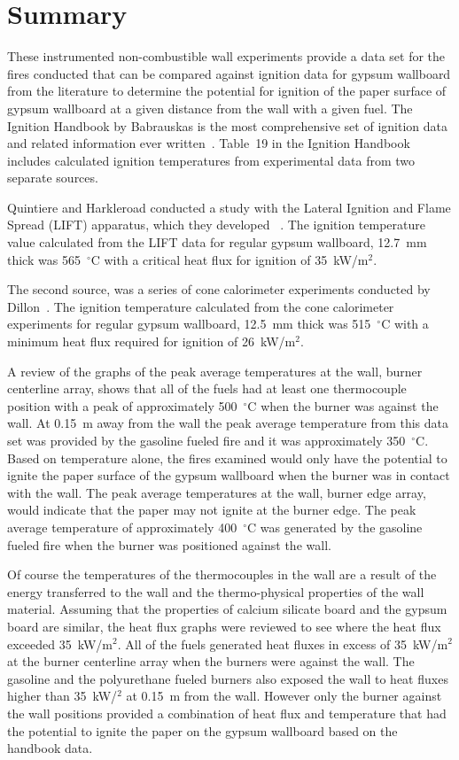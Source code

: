 \documentclass[twoside]{uocthesis}
\begin{document}
{\section{Summary}

These instrumented non-combustible wall experiments provide a data set for the fires conducted that can be compared against ignition data for gypsum wallboard from the literature to determine the potential for ignition of the paper surface of gypsum wallboard at a given distance from the wall with a given fuel. The Ignition Handbook by Babrauskas is the most comprehensive set of ignition data and related information ever written~\cite{Babrauskas:2003}.  Table~19 in the Ignition Handbook includes calculated ignition temperatures from experimental data from two separate sources.

Quintiere and Harkleroad conducted a study with the Lateral Ignition and Flame Spread (LIFT) apparatus, which they developed ~\cite{ASTM_E1321,Quintiere:1985}.
The ignition temperature value calculated from the LIFT data for regular gypsum wallboard, 12.7~mm thick was 565~$^{\circ}$C with a critical heat flux for ignition of 35~kW/m$^2$.

The second source, was a series of cone calorimeter experiments conducted by Dillon~\cite{ASTM_E1354,Dillon:1998}. The ignition temperature calculated from the cone calorimeter experiments for regular gypsum wallboard, 12.5~mm thick was 515~$^{\circ}$C with a minimum heat flux required for ignition of 26~kW/m$^2$.

A review of the graphs of the peak average temperatures at the wall, burner centerline array, shows that all of the fuels had at least one thermocouple position with a peak of approximately 500~$^{\circ}$C when the burner was against the wall.  At 0.15~m away from the wall the peak average temperature from this data set was provided by the gasoline fueled fire and it was approximately 350~$^{\circ}$C.  Based on temperature alone, the fires examined would only have the potential to ignite the paper surface of the gypsum wallboard when the burner was in contact with the wall.  The peak average temperatures at the wall, burner edge array, would indicate that the paper may not ignite at the burner edge.  The peak average temperature of approximately 400~$^{\circ}$C was generated by the gasoline fueled fire when the burner was positioned against the wall.

Of course the temperatures of the thermocouples in the wall are a result of the energy transferred to the wall and the thermo-physical properties of the wall material. Assuming that the properties of calcium silicate board and the gypsum board are similar, the heat flux graphs were reviewed to see where the heat flux exceeded 35~kW/m$^2$. All of the fuels generated heat fluxes in excess of 35~kW/m$^2$ at the burner centerline array when the burners were against the wall.  The gasoline and the polyurethane fueled burners also exposed the wall to heat fluxes higher than 35~kW/$^2$ at 0.15~m from the wall.  However only the burner against the wall positions provided a combination of heat flux and temperature that had the potential to ignite the paper on the gypsum wallboard based on the handbook data.


}
\end{document}
